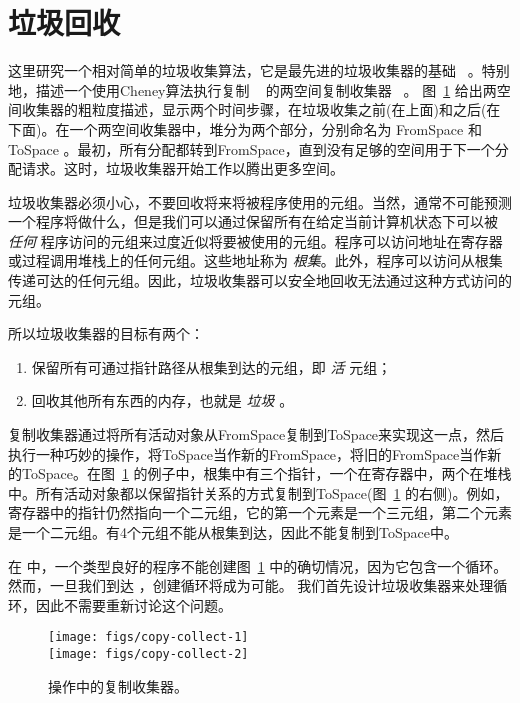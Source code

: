 \documentclass[11pt]{book}
\begin{document}
\section{垃圾回收}
\label{sec:GC}

这里研究一个相对简单的垃圾收集算法，它是最先进的垃圾收集器的基础~\citep{Lieberman:1983aa,Ungar:1984aa,Jones:1996aa,Detlefs:2004aa,Dybvig:2006aa,Tene:2011kx} 。特别地，描述一个使用Cheney算法执行复制 ~\citep{Cheney:1970aa} 的两空间复制收集器~\citep{Wilson:1992fk} 。
图~\ref{fig:copying-collector} 给出两空间收集器的粗粒度描述，显示两个时间步骤，在垃圾收集之前(在上面)和之后(在下面)。在一个两空间收集器中，堆分为两个部分，分别命名为 FromSpace 和 ToSpace 。最初，所有分配都转到FromSpace，直到没有足够的空间用于下一个分配请求。这时，垃圾收集器开始工作以腾出更多空间。

垃圾收集器必须小心，不要回收将来将被程序使用的元组。当然，通常不可能预测一个程序将做什么，但是我们可以通过保留所有在给定当前计算机状态下可以被 \emph{任何} 程序访问的元组来过度近似将要被使用的元组。程序可以访问地址在寄存器或过程调用堆栈上的任何元组。这些地址称为 \emph{根集}。此外，程序可以访问从根集传递可达的任何元组。因此，垃圾收集器可以安全地回收无法通过这种方式访问的元组。

所以垃圾收集器的目标有两个：
\begin{enumerate}
\item 保留所有可通过指针路径从根集到达的元组，即 \emph{活} 元组；
\item 回收其他所有东西的内存，也就是 \emph{垃圾} 。
\end{enumerate}
复制收集器通过将所有活动对象从FromSpace复制到ToSpace来实现这一点，然后执行一种巧妙的操作，将ToSpace当作新的FromSpace，将旧的FromSpace当作新的ToSpace。在图~\ref{fig:copying-collector} 的例子中，根集中有三个指针，一个在寄存器中，两个在堆栈中。所有活动对象都以保留指针关系的方式复制到ToSpace(图~\ref{fig:copying-collector} 的右侧)。例如，寄存器中的指针仍然指向一个二元组，它的第一个元素是一个三元组，第二个元素是一个二元组。有4个元组不能从根集到达，因此不能复制到ToSpace中。

在 \LangVec{} 中，一个类型良好的程序不能创建图~\ref{fig:copying-collector} 中的确切情况，因为它包含一个循环。然而，一旦我们到达 \LangAny{} ，创建循环将成为可能。
我们首先设计垃圾收集器来处理循环，因此不需要重新讨论这个问题。

\begin{figure}[tbp]
\centering
\texttt{[image: figs/copy-collect-1]} \\[5ex]
\texttt{[image: figs/copy-collect-2]}
\caption{操作中的复制收集器。}
\label{fig:copying-collector}
\end{figure}
\end{document}
